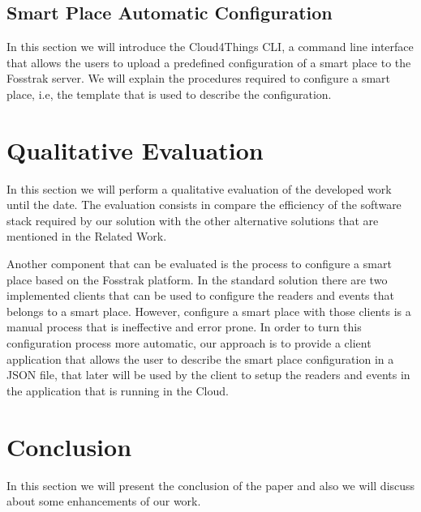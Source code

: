 \documentclass{../llncs2e/llncs}
\begin{document}
\subsection{Smart Place Automatic Configuration}
\label{sub:Smart Place Automatic Configuration}
In this section we will introduce the Cloud4Things CLI, a command line interface that allows the
users to upload a predefined configuration of a smart place to the Fosstrak server. We will explain
the procedures required to configure a smart place, i.e, the template that is used to describe the
configuration.
\section{Qualitative Evaluation}
\label{sec:qualitative_evaluation}
In this section we will perform a qualitative evaluation of the developed work until the date. The
evaluation consists in compare the efficiency of the software stack required by our solution with
the other alternative solutions that are mentioned in the Related Work.

Another component that can be evaluated is the process to configure a smart place based on the
Fosstrak platform. In the standard solution there are two implemented clients that can be used to
configure the readers and events that belongs to a smart place. However, configure a smart place
with those clients is a manual process that is ineffective and error prone. In order to turn this
configuration process more automatic, our approach is to provide a client application that allows
the user to describe the smart place configuration in a JSON file, that later will be used by the
client to setup the readers and events in the application that is running in the Cloud.
\section{Conclusion}
\label{sec:conclusion}
In this section we will present the conclusion of the paper and also we will discuss about some
enhancements of our work.
\end{document}
